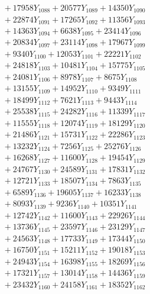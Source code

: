 \documentclass[a4paper,10pt]{article}
\begin{document}
{\begin{align}
&\;  + 17958 Y_{1088} + 20577 Y_{1089} + 14350 Y_{1090} \\[0.3ex]
&\;  + 22874 Y_{1091} + 17265 Y_{1092} + 11356 Y_{1093} \\[0.3ex]
&\;  + 14363 Y_{1094} + 6638 Y_{1095} + 23414 Y_{1096} \\[0.3ex]
&\;  + 20834 Y_{1097} + 23114 Y_{1098} + 17967 Y_{1099} \\[0.3ex]
&\;  + 9340 Y_{1100} + 12053 Y_{1101} + 22221 Y_{1102} \\[0.3ex]
&\;  + 24818 Y_{1103} + 10481 Y_{1104} + 15775 Y_{1105} \\[0.3ex]
&\;  + 24081 Y_{1106} + 8978 Y_{1107} + 8675 Y_{1108} \\[0.5ex]\allowbreak
&\;  + 13155 Y_{1109} + 14952 Y_{1110} + 9349 Y_{1111} \\[0.3ex]
&\;  + 18499 Y_{1112} + 7621 Y_{1113} + 9443 Y_{1114} \\[0.3ex]
&\;  + 25538 Y_{1115} + 24282 Y_{1116} + 11339 Y_{1117} \\[0.3ex]
&\;  + 11555 Y_{1118} + 12074 Y_{1119} + 18129 Y_{1120} \\[0.3ex]
&\;  + 21486 Y_{1121} + 15731 Y_{1122} + 22286 Y_{1123} \\[0.3ex]
&\;  + 13232 Y_{1124} + 7256 Y_{1125} + 25276 Y_{1126} \\[0.3ex]
&\;  + 16268 Y_{1127} + 11600 Y_{1128} + 19454 Y_{1129} \\[0.3ex]
&\;  + 24767 Y_{1130} + 24589 Y_{1131} + 17831 Y_{1132} \\[0.3ex]
&\;  + 12721 Y_{1133} + 18507 Y_{1134} + 7863 Y_{1135} \\[0.3ex]
&\;  + 6589 Y_{1136} + 19605 Y_{1137} + 16233 Y_{1138} \\[0.5ex]\allowbreak
&\;  + 8093 Y_{1139} + 9236 Y_{1140} + 10351 Y_{1141} \\[0.3ex]
&\;  + 12742 Y_{1142} + 11600 Y_{1143} + 22926 Y_{1144} \\[0.3ex]
&\;  + 13736 Y_{1145} + 23597 Y_{1146} + 23129 Y_{1147} \\[0.3ex]
&\;  + 24563 Y_{1148} + 17733 Y_{1149} + 17344 Y_{1150} \\[0.3ex]
&\;  + 16750 Y_{1151} + 15211 Y_{1152} + 19018 Y_{1153} \\[0.3ex]
&\;  + 24943 Y_{1154} + 16398 Y_{1155} + 18269 Y_{1156} \\[0.3ex]
&\;  + 17321 Y_{1157} + 13014 Y_{1158} + 14436 Y_{1159} \\[0.3ex]
&\;  + 23432 Y_{1160} + 24158 Y_{1161} + 18352 Y_{1162} \\[0.3ex]

\end{align}}
\end{document}
